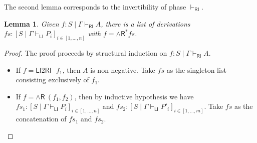 \documentclass[submission,copyright,creativecommons]{eptcs}
\newtheorem{lemma}[theorem]{Lemma}
\theoremstyle{definition}
\newcommand{\andr}{\land \mathsf{R}}
\newcommand{\RI}{\mathsf{RI}}
\newcommand{\LI}{\mathsf{LI}}
\begin{document}
The second lemma corresponds to the invertibility of phase $\vdash_\RI$.

\begin{lemma}\label{lem:RI:invert}
  Given $f : S \mid \Gamma \vdash_{\RI} A$, there is a list of derivations $fs : [S \mid \Gamma \vdash_{\LI} P_i]_{i \in [1 , \dots , n]}$ with $f = \andr^{*} fs$.
\end{lemma}
\begin{proof}
  The proof proceeds by structural induction on $f : S \mid \Gamma \vdash_{\RI} A$.
  \begin{itemize}
    \item If $f = \LI2 \RI \text{ } f_1$, then $A$ is non-negative. Take $fs$ as the singleton list consisting exclusively of $f_1$.
    \item If $f = \andr \ (f_1, f_2)$, then by inductive hypothesis we have $fs_1 : [S \mid \Gamma \vdash_{\LI} P_i]_{i \in [1 , \dots , n]}$ and \linebreak
    $fs_2 : [S \mid \Gamma \vdash_{\LI} P'_i]_{i \in [1 , \dots , m]}$. Take $fs$ as the concatenation of $fs_1$ and $fs_2$.
  \end{itemize}
\end{proof}
\end{document}
